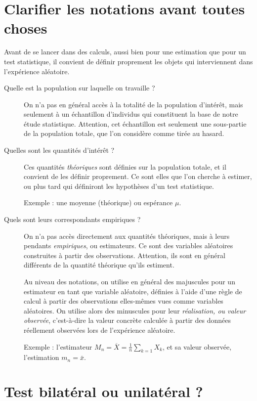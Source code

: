 \documentclass[12pt, a4paper]{book}
\numberwithin{equation}{section}
\begin{document}
\section{Clarifier les notations avant toutes choses}

Avant de se lancer dans des calculs, aussi bien pour une estimation que pour un test statistique, il convient de définir proprement les objets qui interviennent dans l'expérience aléatoire.
\begin{description}
 \item[Quelle est la population sur laquelle on travaille ?]
  On n'a pas en général accès à la totalité de la population d'intérêt, mais seulement à un échantillon d'individus qui constituent la base de notre étude statistique. Attention, cet échantillon est seulement une sous-partie de la population totale, que l'on considère comme tirée au hasard.
 \item[Quelles sont les quantités d'intérêt ?]
  Ces quantités \emph{théoriques} sont définies sur la population totale, et il convient de les définir proprement. Ce sont elles que l'on cherche à estimer, ou plus tard qui définiront les hypothèses d'un test statistique.
  
  Exemple : une moyenne (théorique) ou espérance $\mu$.
 \item[Quels sont leurs correspondants empiriques ?]
  On n'a pas accès directement aux quantités théoriques, mais à leurs pendants \emph{empiriques}, ou estimateurs. Ce sont des variables aléatoires construites à partir des observations. Attention, ils sont en général différents de la quantité théorique qu'ils estiment.
  
  Au niveau des notations, on utilise en général des majuscules pour un estimateur en tant que variable aléatoire, définies à l'aide d'une règle de calcul à partir des observations elles-mêmes vues comme variables aléatoires. On utilise alors des minuscules pour leur \emph{réalisation, ou valeur observée}, c'est-à-dire la valeur concrète calculée à partir des données réellement observées lors de l'expérience aléatoire.
  
  Exemple : l'estimateur $M_n = \overline{X} =\frac{1}{n} \sum_{k=1} X_k$, et sa valeur observée, l'estimation $m_n = \bar{x}$.
\end{description}

\section{Test bilatéral ou unilatéral ?}
\end{document}
